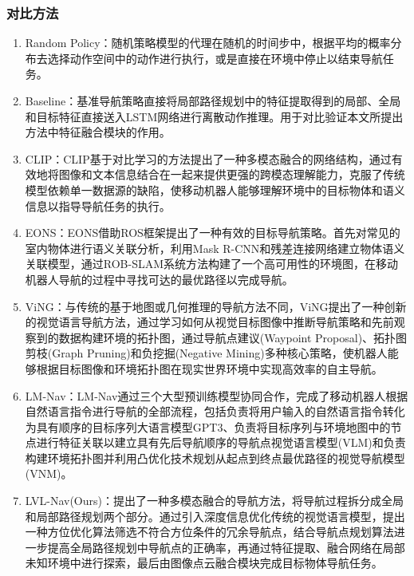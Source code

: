 \subsubsection{对比方法}
\begin{enumerate}[topsep = 0 pt, itemsep= 0 pt, parsep=0pt, partopsep=0pt, leftmargin=44pt, itemindent=0pt, labelsep=6pt, label=(\arabic*)]
    \item 	Random Policy：随机策略模型的代理在随机的时间步中，根据平均的概率分布去选择动作空间中的动作进行执行，或是直接在环境中停止以结束导航任务。
    \item	Baseline：基准导航策略直接将局部路径规划中的特征提取得到的局部、全局和目标特征直接送入LSTM网络进行离散动作推理。用于对比验证本文所提出方法中特征融合模块的作用。
    \item   CLIP：CLIP基于对比学习的方法提出了一种多模态融合的网络结构，通过有效地将图像和文本信息结合在一起来提供更强的跨模态理解能力，克服了传统模型依赖单一数据源的缺陷，使移动机器人能够理解环境中的目标物体和语义信息以指导导航任务的执行。
    \item   EONS：EONS借助ROS框架提出了一种有效的目标导航策略。首先对常见的室内物体进行语义关联分析，利用Mask R-CNN和残差连接网络建立物体语义关联模型，通过ROB-SLAM系统方法构建了一个高可用性的环境图，在移动机器人导航的过程中寻找可达的最优路径以完成导航。
    \item	ViNG：与传统的基于地图或几何推理的导航方法不同，ViNG提出了一种创新的视觉语言导航方法，通过学习如何从视觉目标图像中推断导航策略和先前观察到的数据构建环境的拓扑图，通过导航点建议(Waypoint Proposal)、拓扑图剪枝(Graph Pruning)和负挖掘(Negative Mining)多种核心策略，使机器人能够根据目标图像和环境拓扑图在现实世界环境中实现高效率的自主导航。
    \item	LM-Nav：LM-Nav通过三个大型预训练模型协同合作，完成了移动机器人根据自然语言指令进行导航的全部流程，包括负责将用户输入的自然语言指令转化为具有顺序的目标序列大语言模型GPT3、负责将目标序列与环境地图中的节点进行特征关联以建立具有先后导航顺序的导航点视觉语言模型(VLM)和负责构建环境拓扑图并利用凸优化技术规划从起点到终点最优路径的视觉导航模型(VNM)。
    \item	LVL-Nav(Ours)：提出了一种多模态融合的导航方法，将导航过程拆分成全局和局部路径规划两个部分。通过引入深度信息优化传统的视觉语言模型，提出一种方位优化算法筛选不符合方位条件的冗余导航点，结合导航点规划算法进一步提高全局路径规划中导航点的正确率，再通过特征提取、融合网络在局部未知环境中进行探索，最后由图像点云融合模块完成目标物体导航任务。
	
\end{enumerate}

